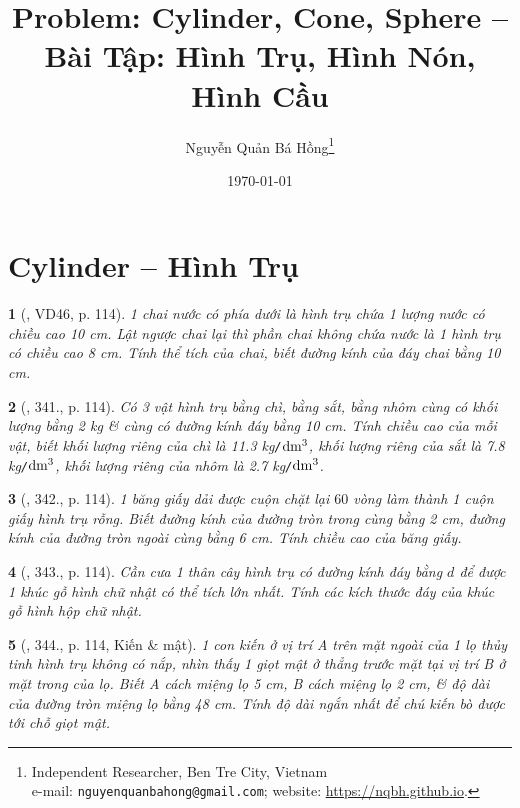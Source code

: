 \documentclass{article}
\title{Problem: Cylinder, Cone, Sphere -- Bài Tập: Hình Trụ, Hình Nón, Hình Cầu}
\author{Nguyễn Quản Bá Hồng\footnote{Independent Researcher, Ben Tre City, Vietnam\\e-mail: \texttt{nguyenquanbahong@gmail.com}; website: \url{https://nqbh.github.io}.}}
\date{\today}
\newtheorem{baitoan}{}
\begin{document}
\maketitle
\tableofcontents


\section{Cylinder -- Hình Trụ}

\begin{baitoan}[\cite{Binh_Toan_9_tap_2}, VD46, p. 114]
	1 chai nước có phía dưới là hình trụ chứa 1 lượng nước có chiều cao {\rm10 cm}. Lật ngược chai lại thì phần chai không chứa nước là 1 hình trụ có chiều cao {\rm8 cm}. Tính thể tích của chai, biết đường kính của đáy chai bằng {\rm10 cm}.
\end{baitoan}

\begin{baitoan}[\cite{Binh_Toan_9_tap_2}, 341., p. 114]
	Có 3 vật hình trụ bằng chì, bằng sắt, bằng nhôm cùng có khối lượng bằng {\rm2 kg} \& cùng có đường kính đáy bằng {\rm10 cm}. Tính chiều cao của mỗi vật, biết khối lượng riêng của chì là {\rm11.3 kg{\tt/}$\rm dm^3$}, khối lượng riêng của sắt là {\rm7.8 kg{\tt/}$\rm dm^3$}, khối lượng riêng của nhôm là {\rm2.7 kg{\tt/}$\rm dm^3$}.
\end{baitoan}

\begin{baitoan}[\cite{Binh_Toan_9_tap_2}, 342., p. 114]
	1 băng giấy dải được cuộn chặt lại $60$ vòng làm thành 1 cuộn giấy hình trụ rỗng. Biết đường kính của đường tròn trong cùng bằng {\rm2 cm}, đường kính của đường tròn ngoài cùng bằng {\rm6 cm}. Tính chiều cao của băng giấy.
\end{baitoan}

\begin{baitoan}[\cite{Binh_Toan_9_tap_2}, 343., p. 114]
	Cần cưa 1 thân cây hình trụ có đường kính đáy bằng $d$ để được 1 khúc gỗ hình chữ nhật có thể tích lớn nhất. Tính các kích thước đáy của khúc gỗ hình hộp chữ nhật.
\end{baitoan}

\begin{baitoan}[\cite{Binh_Toan_9_tap_2}, 344., p. 114, Kiến \& mật]
	1 con kiến ở vị trí A trên mặt ngoài của 1 lọ thủy tinh hình trụ không có nắp, nhìn thấy 1 giọt mật ở thẳng trước mặt tại vị trí B ở mặt trong của lọ. Biết A cách miệng lọ {\rm5 cm}, B cách miệng lọ {\rm2 cm}, \& độ dài của đường tròn miệng lọ bằng {\rm48 cm}. Tính độ dài ngắn nhất để chú kiến bò được tới chỗ giọt mật.
\end{baitoan}
\end{document}
